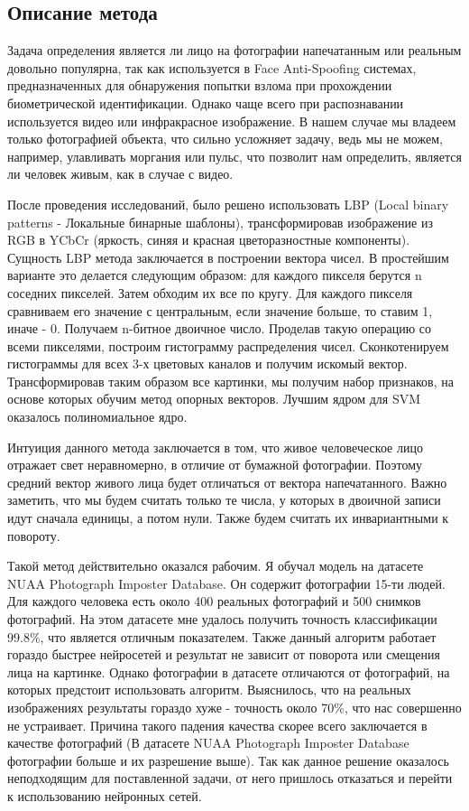 \documentclass[a4paper,14pt]{extarticle}
\begin{document}
    \subsection{Описание метода}
    \par Задача определения является ли лицо на фотографии напечатанным или реальным довольно популярна, так как используется в Face Anti-Spoofing системах, предназначенных для обнаружения попытки взлома при прохождении биометрической идентификации. Однако чаще всего при распознавании используется видео или инфракрасное изображение. В нашем случае мы владеем только фотографией объекта, что сильно усложняет задачу, ведь мы не можем, например, улавливать моргания или пульс, что позволит нам определить, является ли человек живым, как в случае с видео.
    \par После проведения исследований, было решено использовать LBP (Local binary patterns - Локальные бинарные шаблоны), трансформировав изображение из RGB в YCbCr (яркость, синяя и красная цветоразностные компоненты). Сущность LBP метода заключается в построении вектора чисел. В простейшим варианте это делается следующим образом: для каждого пикселя берутся n соседних пикселей. Затем обходим их все по кругу. Для каждого пикселя сравниваем его значение с центральным, если значение больше, то ставим 1, иначе - 0. Получаем n-битное двоичное число. Проделав такую операцию со всеми пикселями, построим гистограмму распределения чисел. Сконкотенируем гистограммы для всех 3-х цветовых каналов и получим искомый вектор. Трансформировав таким образом все картинки, мы получим набор признаков, на основе которых обучим метод опорных векторов. Лучшим ядром для SVM оказалось полиномиальное ядро.
    \par Интуиция данного метода заключается в том, что живое человеческое лицо отражает свет неравномерно, в отличие от бумажной фотографии. Поэтому средний вектор живого лица будет отличаться от вектора напечатанного. Важно заметить, что мы будем считать только те числа, у которых в двоичной записи идут сначала единицы, а потом нули. Также будем считать их инвариантными к повороту.
    \par Такой метод действительно оказался рабочим. Я обучал модель на датасете NUAA Photograph Imposter Database. Он содержит фотографии 15-ти людей. Для каждого человека есть около 400 реальных фотографий и 500 снимков фотографий. На этом датасете мне удалось получить точность классификации 99.8\%, что является отличным показателем. Также данный алгоритм работает гораздо быстрее нейросетей и результат не зависит от поворота или смещения лица на картинке. Однако фотографии в датасете отличаются от фотографий, на которых предстоит использовать алгоритм. Выяснилось, что на реальных изображениях результаты гораздо хуже - точность около 70\%, что нас совершенно не устраивает. Причина такого падения качества скорее всего заключается в качестве фотографий (В датасете NUAA Photograph Imposter Database фотографии больше и их разрешение выше). Так как данное решение оказалось неподходящим для поставленной задачи, от него пришлось отказаться и перейти к использованию нейронных сетей.
\end{document}
